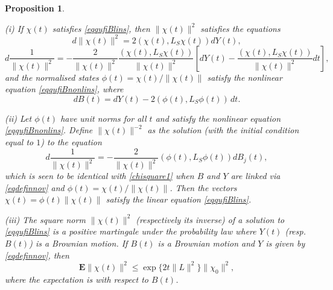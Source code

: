 \documentclass[10pt,a4paper]{amsart}
\def\E{\mathbf{E}}
\newtheorem{prop}{Proposition}[section]
\begin{document}
\begin{prop}
\label{linnorrmpure}

(i) If $\chi(t)$ satisfies \eqref{eqqufiBlins},
then $\|\chi(t)\|^2$ satisfies the equations
 \begin{equation}
\label{chisquare}
d\|\chi(t)\|^2=2(\chi(t),L_S \chi(t))dY(t),
\end{equation}
 \begin{equation}
\label{chisquare1}
d\frac{1}{\|\chi(t)\|^2}=-\frac{2}{\|\chi(t)\|^2}
 \frac{(\chi(t),L_S \chi(t))}{\|\chi(t)\|^2}
\left[dY(t)- \frac{(\chi(t),L_S \chi(t))}{\|\chi(t)\|^2} dt\right],
\end{equation}
and the normalised states $\phi(t)=\chi(t)/\|\chi(t)\|$ satisfy the
nonlinear equation \eqref{eqqufiBnonlins}, where
\begin{equation}
\label{eqdefinnov1}
dB(t)=dY(t)-2(\phi(t), L_S \phi(t)) \, dt.
\end{equation}

(ii) Let $\phi(t)$ have unit norms for all $t$ and satisfy the
nonlinear equation \eqref{eqqufiBnonlins}. Define $\|\chi(t)\|^{-2}$ as the solution
(with the initial condition equal to $1$) to the equation
 \begin{equation}
\label{chisquare4}
d\frac{1}{\|\chi(t)\|^2}=-\frac{2}{\|\chi(t)\|^2}
(\phi(t),L_S \phi(t)) dB_j(t),
\end{equation}
which is seen to be identical with \eqref{chisquare1}
when $B$ and $Y$ are linked via \eqref{eqdefinnov} and $\phi(t)=\chi(t)/\|\chi(t)\|$.
 Then the vectors
$\chi(t)=\phi(t) \|\chi(t)\|$ satisfy the linear equation \eqref{eqqufiBlins}.

(iii) The square norm $\|\chi(t)\|^2$ (respectively its inverse) of a solution
to \eqref{eqqufiBlins} is a positive martingale under
the probability law where $Y(t)$ (resp. $B(t)$) is a Brownian motion. If $B(t)$ is
a Brownian motion and $Y$ is given by \eqref{eqdefinnov}, then
 \begin{equation}
\label{chisquare5}
\E \|\chi(t)\|^2 \le \exp\{2 t \|L\|^2 \} \|\chi_0\|^2,
\end{equation}
where the expectation is with respect to $B(t)$.
\end{prop}
\end{document}
